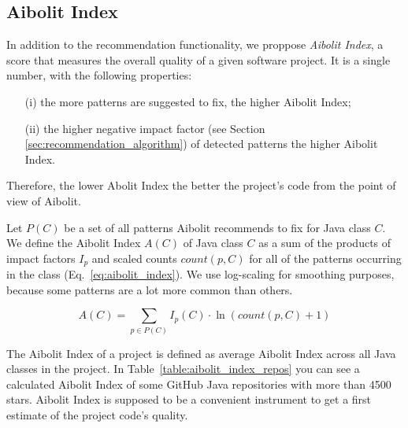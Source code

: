 
\subsection{Aibolit Index}

In addition to the recommendation functionality, we proppose \textit{Aibolit Index},
a score that measures the overall quality of a given software project.
It is a single number, with the following properties:
\begin{itemize}
\item[(i)] the more patterns are suggested to fix, the higher Aibolit Index;
\item[(ii)] the higher negative impact factor (see Section \ref{sec:recommendation_algorithm})
of detected patterns the higher Aibolit Index.
\end{itemize}
Therefore, the lower Abolit Index the better the project's code from the point
of view of Aibolit.

Let $P(C)$ be a set of all patterns Aibolit recommends to fix for Java class $C$.
We define the Aibolit Index $A(C)$ of Java class $C$ as a sum of the products of
impact factors $I_{p}$ and scaled counts $count(p, C)$ for all of the
patterns occurring in the class (Eq.~\ref{eq:aibolit_index}). We use log-scaling for smoothing purposes, because some patterns are a lot more common than others.


\begin{equation}
    A(C) = \sum_{p \in P(C)} { I_{p}(C) \cdot \ln{(count(p, C) + 1)} } \label{eq:aibolit_index}
\end{equation}


The Aibolit Index of a project is defined as average Aibolit Index
across all Java classes in the project. In Table~\ref{table:aibolit_index_repos}
you can see a calculated Aibolit Index of some GitHub Java repositories with
more than 4500 stars. Aibolit Index is supposed to be a convenient instrument
to get a first estimate of the project code's quality.

